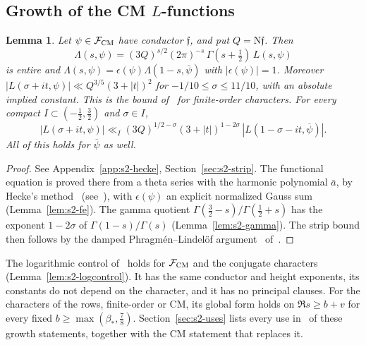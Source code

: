 \documentclass[11pt]{article}
\numberwithin{equation}{section}
\newcommand{\N}{\mathrm N}
\newtheorem{lemma}{Lemma}
\begin{document}
\subsection{Growth of the CM \texorpdfstring{$L$}{L}-functions}
\begin{lemma}\label{lem:cm-growth}
Let $\psi\in\mathcal F_{\rm CM}$ have conductor $\mathfrak f$, and put $Q=\N\mathfrak f$. Then
\begin{equation}\label{eq:d077}
 \Lambda(s,\psi)=(3Q)^{s/2}(2\pi)^{-s}\,\Gamma(s+\tfrac12)\,L(s,\psi)
\end{equation}
is entire and $\Lambda(s,\psi)=\epsilon(\psi)\Lambda(1-s,\overline\psi)$ with $|\epsilon(\psi)|=1$. Moreover
$|L(\sigma+it,\psi)|\ll Q^{3/5}(3+|t|)^2$ for $-1/10\le\sigma\le11/10$, with an absolute implied constant. This
is the bound of~\cite[Lemma~4.8]{OAI78} for finite-order characters. For every compact
$I\subset(-\frac12,\frac32)$ and $\sigma\in I$,
\begin{equation}\label{eq:d078}
 |L(\sigma+it,\psi)|\ll_I(3Q)^{1/2-\sigma}(3+|t|)^{1-2\sigma}\,|L(1-\sigma-it,\overline\psi)| .
\end{equation}
All of this holds for $\overline\psi$ as well.
\end{lemma}
\begin{proof}
See Appendix~\ref{app:s2-hecke}, Section~\ref{sec:s2-strip}. The functional equation is proved there from a
theta series with the harmonic polynomial $\bar a$, by Hecke's method~\cite{Hec20} (see~\cite[Ch.~VII, \S\S7--8]{Neukirch}), with $\epsilon(\psi)$ an explicit normalized Gauss sum
(Lemma~\ref{lem:s2-fe}). The gamma quotient $\Gamma(\frac32-s)/\Gamma(\frac12+s)$ has the exponent
$1-2\sigma$ of $\Gamma(1-s)/\Gamma(s)$ (Lemma~\ref{lem:s2-gamma}). The strip bound then follows by the damped
Phragm\'en--Lindel\"of argument~\cite{PL08} of~\cite[proof of Lemma~4.8]{OAI78}.
\end{proof}
The logarithmic control of~\cite[Lemma~4.9]{OAI78} holds for $\mathcal F_{\rm CM}$ and the
conjugate characters (Lemma~\ref{lem:s2-logcontrol}). It has the same conductor and height exponents, its
constants do not depend on the character, and it has no principal clauses. For the characters of the rows,
finite-order or CM, its global form holds on $\Re s\ge b+v$ for every fixed $b\ge\max(\beta_*,\frac78)$.
Section~\ref{sec:s2-uses} lists every use in~\cite{OAI78} of these growth statements, together with the CM
statement that replaces it.
\end{document}
